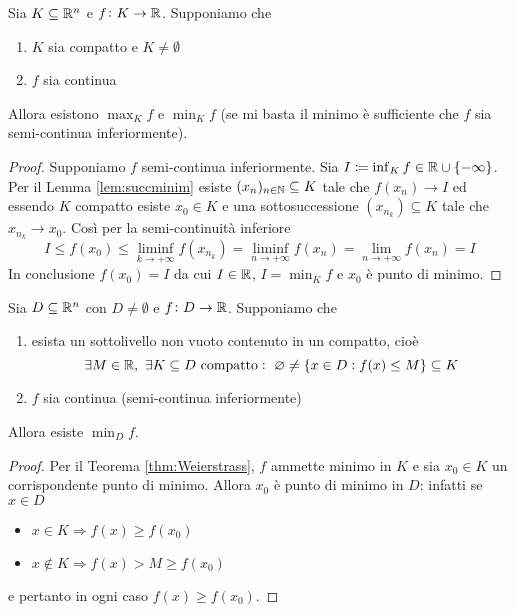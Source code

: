 \begin{thm}[Weierstrass] \label{thm:Weierstrass}
	Sia $ K \subseteq \mathbb{R}^n $ e $ f \colon K \to \mathbb{R} $. Supponiamo che
	\begin{enumerate}[label = (\roman*)]
		\item $ K $ sia compatto e $ K \neq \emptyset $
		\item $ f $ sia continua
	\end{enumerate}
	Allora esistono $ \max_K f $ e $ \min_K f $	(se mi basta il minimo è sufficiente che $ f $ sia semi-continua inferiormente). 
\end{thm}
%
\begin{proof}
	Supponiamo $ f $ semi-continua inferiormente. Sia $ I \coloneqq \inf_K f \in \mathbb{R} \cup \{-\infty\} $. Per il Lemma \ref{lem:succminim} esiste $ (x_n)_{n \in \mathbb{N}} \subseteq K $ tale che $ f(x_n) \to I $ ed essendo $ K $ compatto esiste $ x_0 \in K $ e una sottosuccessione $ (x_{n_k}) \subseteq K $ tale che $ x_{n_k} \to x_0 $. Così per la semi-continuità inferiore
	\[
		I \leq f(x_0) \leq \liminf_{k \to +\infty} f(x_{n_k}) = \liminf_{n \to +\infty} f(x_n) = \lim_{n \to +\infty} f(x_n) = I
	\]
	In conclusione $ f(x_0) = I $ da cui $ I \in \mathbb{R} $, $ I = \min_K f $ e $ x_0 $ è punto di minimo.
\end{proof}

\begin{thm} \label{thm:Weierstrassgen1}
	Sia $ D \subseteq \mathbb{R}^n $ con $ D \neq \emptyset $ e $ f \colon D \to \mathbb{R} $. Supponiamo che
	\begin{enumerate}[label = (\roman*)]
		\item esista un sottolivello non vuoto contenuto in un compatto, cioè
		\[
			\exists M \in \mathbb{R}, \ \exists K \subseteq D \text{ compatto} : \ \varnothing \neq \{x \in D : f(x) \leq M\} \subseteq K
		\]
		\item $ f $ sia continua (semi-continua inferiormente)
	\end{enumerate}
	Allora esiste $ \min_D f $. 
\end{thm}
%
\begin{proof}
	Per il Teorema \ref{thm:Weierstrass}, $ f $ ammette minimo in $ K $ e sia $ x_0 \in K $ un corrispondente punto di minimo. Allora $ x_0 $ è punto di minimo in $ D $: infatti se $ x \in D $
	\begin{itemize}
		\item $ x \in K \Rightarrow f(x) \geq f(x_0) $
		\item $ x \notin K \Rightarrow f(x) > M \geq f(x_0) $
	\end{itemize}
	e pertanto in ogni caso $ f(x) \geq f(x_0) $. 
\end{proof}

